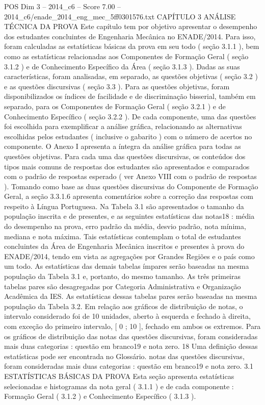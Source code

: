 \begin{textsample}{POS Dim 3 – 2014\_c6 – Score 7.00 – 2014\_c6/enade\_2014\_eng\_mec\_5ff0301576.txt}  \label{ex:f3_pos_033}
CAPÍTULO 3 ANÁLISE TÉCNICA DA PROVA Este capítulo tem por objetivo apresentar o desempenho dos estudantes concluintes de Engenharia Mecânica no ENADE/2014.
Para isso, foram calculadas as estatísticas básicas da prova em seu todo ( seção 3.1.1 ), bem como as estatísticas relacionadas aos Componentes de Formação Geral ( seção 3.1.2 ) e de Conhecimento Específico da Área ( seção 3.1.3 ).
Dadas as suas características, foram analisadas, em separado, as questões objetivas ( seção 3.2 ) e as questões discursivas ( seção 3.3 ).
Para as questões objetivas, foram disponibilizados os índices de facilidade e de discriminação bisserial, também em separado, para os Componentes de Formação Geral ( seção 3.2.1 ) e de Conhecimento Específico ( seção 3.2.2 ).
De cada componente, uma das questões foi escolhida para exemplificar a análise gráfica, relacionando as alternativas escolhidas pelos estudantes ( inclusive o gabarito ) com o número de acertos no componente.
O Anexo I apresenta a íntegra da análise gráfica para todas as questões objetivas.
Para cada uma das questões discursivas, os conteúdos dos tipos mais comuns de respostas dos estudantes são apresentados e comparados com o padrão de respostas esperado ( ver Anexo VIII com o padrão de respostas ).
Tomando como base as duas questões discursivas do Componente de Formação Geral, a seção 3.3.1.6 apresenta comentários sobre a correção das respostas com respeito à Língua Portuguesa.
Na Tabela 3.1 são apresentados o tamanho da população inscrita e de presentes, e as seguintes estatísticas das notas18 : média do desempenho na prova, erro padrão da média, desvio padrão, nota mínima, mediana e nota máxima.
Tais estatísticas contemplam o total de estudantes concluintes da Área de Engenharia Mecânica inscritos e presentes à prova do ENADE/2014, tendo em vista as agregações por Grandes Regiões e o país como um todo.
As estatísticas das demais tabelas ímpares serão baseadas na mesma população da Tabela 3.1 e, portanto, do mesmo tamanho.
As três primeiras tabelas pares são desagregadas por Categoria Administrativa e Organização Acadêmica da IES.
As estatísticas dessas tabelas pares serão baseadas na mesma população da Tabela 3.2.
Em relação aos gráficos de distribuição de notas, o intervalo considerado foi de 10 unidades, aberto à esquerda e fechado à direita, com exceção do primeiro intervalo, [ 0 ; 10 ], fechado em ambos os extremos.
Para os gráficos de distribuição das notas das questões discursivas, foram consideradas mais duas categorias : questão em branco19 e nota zero. 18 Uma definição dessas estatísticas pode ser encontrada no Glossário. notas das questões discursivas, foram consideradas mais duas categorias : questão em branco19 e nota zero. 3.1 ESTATÍSTICAS BÁSICAS DA PROVA Esta seção apresenta estatísticas selecionadas e histogramas da nota geral ( 3.1.1 ) e de cada componente : Formação Geral ( 3.1.2 ) e Conhecimento Específico ( 3.1.3 ).

\end{textsample}
